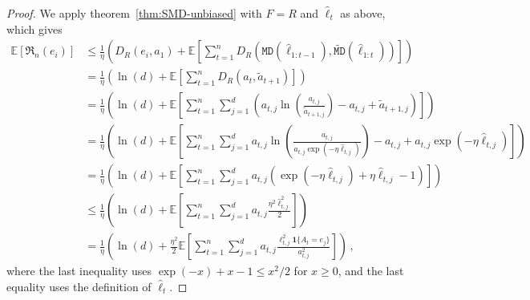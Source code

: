 \documentclass{article}
\theoremstyle{plain}
\theoremstyle{definition}
\newcommand{\Reg}{\mathfrak{R}}
\newcommand{\E}{\mathbb E}
\newcommand{\fmd}{\texttt{MD}}
\newcommand{\tfmd}{\widetilde{\texttt{MD}}}
\newcommand{\hl}{\hat{\ell}\xspace}
\begin{document}
\begin{proof}
    We apply theorem~\ref{thm:SMD-unbiased} with $F=R$ and $\hl_t$ as above,
    which gives
    \begin{align*}
        \E[\Reg_n(e_i)]
         & \leq
        \frac{1}{\eta}\left(
        D_R(e_i, a_1)
        +
        \E\left[
            \sum_{t=1}^{n} D_R(\fmd(\hl_{1:t-1}), \tfmd(\hl_{1:t}))
            \right]
        \right) \\
         & =
        \frac{1}{\eta}\left(
        \ln(d)
        +
        \E\left[
                \sum_{t=1}^{n} D_R(a_t, \tilde{a}_{t+1})
                \right]
        \right) \\
         & =
        \frac{1}{\eta}\left(
        \ln(d)
        +
        \E\left[
            \sum_{t=1}^{n}
            \sum_{j=1}^{d}
            \left(
            a_{t,j} \ln\left(\frac{a_{t,j}}{\tilde{a}_{t+1,j}}\right)
            - a_{t,j} + \tilde{a}_{t+1,j}
            \right)
            \right]
        \right) \\
         & =
        \frac{1}{\eta}\left(
        \ln(d)
        +
        \E\left[
            \sum_{t=1}^{n}
            \sum_{j=1}^{d}
            a_{t,j} \ln\left(\frac{a_{t,j}}{a_{t,j} \exp(-\eta\hl_{t,j})}\right)
            - a_{t,j}
            + a_{t,j} \exp(-\eta\hl_{t,j})
            \right]
        \right) \\
         & =
        \frac{1}{\eta}\left(
        \ln(d)
        +
        \E\left[
            \sum_{t=1}^{n}
            \sum_{j=1}^{d}
            a_{t,j} \left(
            \exp(-\eta\hl_{t,j})
            + \eta\hl_{t,j}
            - 1
            \right)
            \right]
        \right)
        \\
         & \leq
        \frac{1}{\eta}\left(
        \ln(d)
        +
        \E\left[
            \sum_{t=1}^{n}
            \sum_{j=1}^{d}
            a_{t,j}
            \frac{
            \eta^2
            \hl_{t,j}^2
            }{2}
            \right]
        \right)
        \\
         & =
        \frac{1}{\eta}\left(
        \ln(d)
        +
        \frac{
            \eta^2
        }{2}
        \E\left[
            \sum_{t=1}^{n}
            \sum_{j=1}^{d}
            a_{t,j}
            \frac{
            \ell_{t,j}^2 \mathbf{1}\{A_t=e_j\}
            }{a_{t,j}^2}
            \right]
        \right)\,,
    \end{align*}
    where the last inequality uses $\exp(-x) + x -1 \leq x^2/2$ for $x\geq 0$,
    and the last equality uses the definition of $\hl_t$.

\end{proof}
\end{document}
